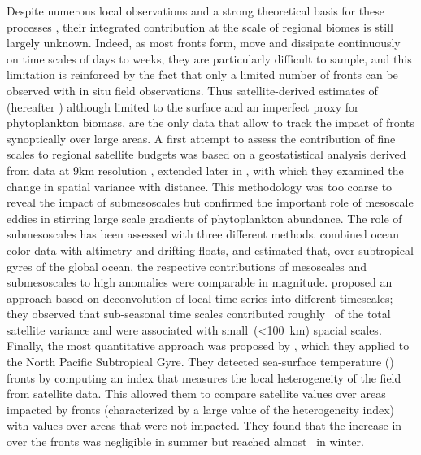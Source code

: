 Despite numerous local observations and a strong theoretical basis for these processes \parencite[e.g.\ recent studies by][]{marrec_2018, little_2018, verneil_2019, ruiz_2019, uchida_2020, kessouri_2020, tzortzis_2021}, their integrated contribution at the scale of regional biomes is still largely unknown.
Indeed, as most fronts form, move and dissipate continuously on time scales of days to weeks, they are particularly difficult to sample, and this limitation is reinforced by the fact that only a limited number of fronts can be observed with in situ field observations.
Thus satellite-derived estimates of  (hereafter ) although limited to the surface and an imperfect proxy for phytoplankton biomass, are the only data that allow to track the impact of fronts synoptically over large areas.
A first attempt to assess the contribution of fine scales to regional satellite  budgets was based on a geostatistical analysis derived from data at 9km resolution \parencite{doney_2003}, extended later in \textcite{glover_2018}, with which they examined the change in spatial variance with distance.
This methodology was too coarse to reveal the impact of submesoscales but confirmed the important role of mesoscale eddies in stirring large scale gradients of phytoplankton abundance.
The role of submesoscales has been assessed with three different methods.
\textcite{guo_2019} combined ocean color data with altimetry and drifting floats, and estimated that, over subtropical gyres of the global ocean, the respective contributions of mesoscales and submesoscales to high  anomalies were comparable in magnitude.
\textcite{keerthi_2022} proposed an approach based on deconvolution of local  time series into different timescales; they observed that sub-seasonal time scales contributed roughly~ of the total satellite  variance and were associated with small~(\qty{<100}{\km}) spacial scales.
Finally, the most quantitative approach was proposed by \textcite{liu_2016}, which they applied to the North Pacific Subtropical Gyre.
They detected sea-surface temperature () fronts by computing an index that measures the local heterogeneity of the  field from satellite  data.
This allowed them to compare satellite  values over areas impacted by fronts (characterized by a large value of the heterogeneity index) with values over areas that were not impacted.
They found that the increase in  over the fronts was negligible in summer but reached almost~ in winter.

